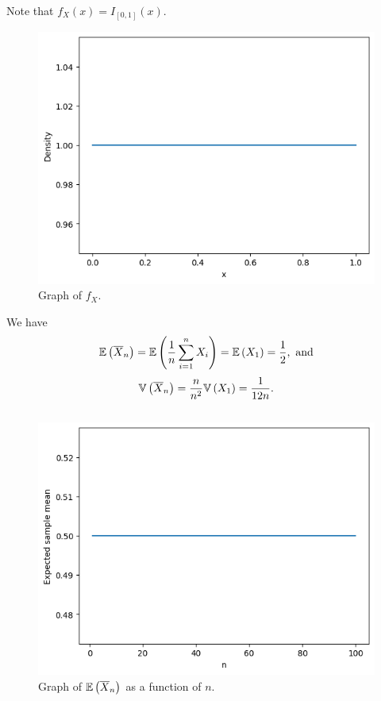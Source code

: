 \begin{ex}
  Note that $f_X(x)=I_{[0,1]}(x)$.
  \begin{figure}[H]
    \centering
    \includegraphics[scale=0.8]{../images/03-19a}
    \caption{Graph of $f_X$.}
  \end{figure}

  We have
  \[
    \mathbb{E}\left(\overline{X}_n\right)
    =\mathbb{E}\left(\frac{1}{n}\sum_{i=1}^n X_i\right)
    =\mathbb{E}\left(X_1\right)=\frac{1}{2}, \text{ and}
  \]
  \[
    \mathbb{V}\left(\overline{X}_n\right)
    =\frac{n}{n^2}\mathbb{V}\left(X_1\right)
    =\frac{1}{12n}.
  \]

  \inputminted{python}{../code/03-19b.py}

  \begin{figure}[H]
    \centering
    \includegraphics[scale=0.8]{../images/03-19b}
    \caption{Graph of $\mathbb{E}\left(\overline{X}_n\right)$ as a function of $n$.}
  \end{figure}


\end{ex}
